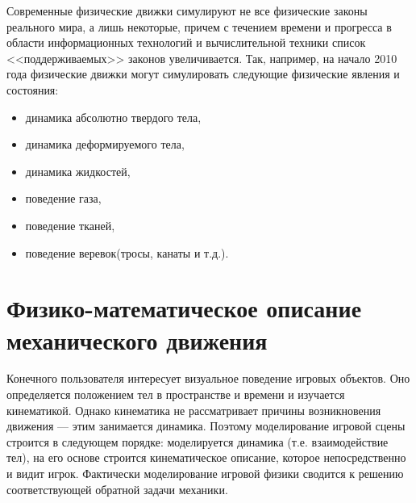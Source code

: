 Современные физические движки симулируют не все физические законы реального мира, а лишь некоторые,
причем с течением времени и прогресса в области информационных технологий и вычислительной техники
список <<поддерживаемых>> законов увеличивается. Так, например, на начало 2010 года\cite[19]{Boeing} физические движки 
могут симулировать следующие физические явления и состояния:
\begin{itemize}
  \item динамика абсолютно твердого тела,
  \item динамика деформируемого тела,
  \item динамика жидкостей,
  \item поведение газа, 
  \item поведение тканей,
  \item поведение веревок(тросы, канаты и т.д.).
\end{itemize}


\section{Физико-математическое описание механического движения}
Конечного пользователя интересует визуальное поведение игровых объектов.
Оно определяется положением тел в пространстве и времени и изучается кинематикой. Однако
кинематика не рассматривает причины возникновения движения --- этим занимается динамика. Поэтому
моделирование игровой сцены строится в следующем порядке: моделируется динамика (т.е. взаимодействие тел), на
его основе строится кинематическое описание, которое непосредственно и видит игрок. Фактически
моделирование игровой физики сводится к решению соответствующей обратной задачи механики.




